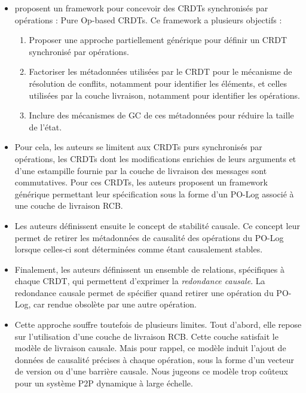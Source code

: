 \begin{itemize}
    \item \textcite{baquero2017pure} proposent un framework pour concevoir des \acp{CRDT} synchronisés par opérations : Pure Op-based \acp{CRDT}.
        Ce framework a plusieurs objectifs :
        \begin{enumerate}
            \item Proposer une approche partiellement générique pour définir un \ac{CRDT} synchronisé par opérations.
            \item Factoriser les métadonnées utilisées par le \ac{CRDT} pour le mécanisme de résolution de conflits, notamment pour identifier les éléments, et celles utilisées par la couche livraison, notamment pour identifier les opérations.
            \item Inclure des mécanismes de \ac{GC} de ces métadonnées pour réduire la taille de l'état.
        \end{enumerate}
    \item Pour cela, les auteurs se limitent aux \acp{CRDT} purs synchronisés par opérations, \ie les \acp{CRDT} dont les modifications enrichies de leurs arguments et d'une estampille fournie par la couche de livraison des messages sont commutatives.
        Pour ces \acp{CRDT}, les auteurs proposent un framework générique permettant leur spécification sous la forme d'un PO-Log associé à une couche de livraison \ac{RCB}.
    \item Les auteurs définissent ensuite le concept de stabilité causale.
        Ce concept leur permet de retirer les métadonnées de causalité des opérations du PO-Log lorsque celles-ci sont déterminées comme étant causalement stables.
    \item Finalement, les auteurs définissent un ensemble de relations, spécifiques à chaque \ac{CRDT}, qui permettent d'exprimer la \emph{redondance causale}.
        La redondance causale permet de spécifier quand retirer une opération du PO-Log, car rendue obsolète par une autre opération.
    \item Cette approche souffre toutefois de plusieurs limites.
        Tout d'abord, elle repose sur l'utilisation d'une couche de livraison \ac{RCB}.
        Cette couche satisfait le modèle de livraison causale.
        Mais pour rappel, ce modèle induit l'ajout de données de causalité précises à chaque opération, sous la forme d'un vecteur de version ou d'une barrière causale.
        Nous jugeons ce modèle trop coûteux pour un système \ac{P2P} dynamique à large échelle.

\end{itemize}
